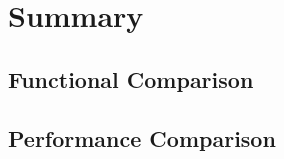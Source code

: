 \chapter{Summary\label{chp:summary}}

\section{Functional Comparison}

\section{Performance Comparison}
